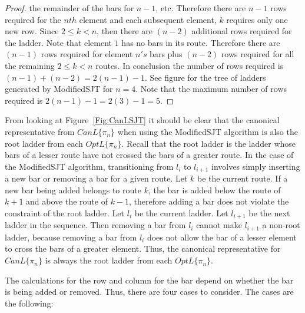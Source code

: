 \begin{proof}
  the remainder of the bars for $n-1$, etc. Therefore there are $n-1$ rows required for the $nth$ element and each subsequent 
  element, $k$ requires only one new row. Since $2 \leq k < n$, then there are $(n-2)$ additional rows required for the ladder. Note that element 
  $1$ has no bars in its route. Therefore there are $(n-1)$ rows required for element $n's$ bars  plus $(n-2)$ rows required for 
  all the remaining $2 \leq k < n$ routes. In conclusion the number of rows required is $(n-1) + (n-2) = 2(n-1)-1$. 
  See figure for the tree of ladders 
  generated by {\sc ModifiedSJT} for $n=4$. Note that the maximum number of rows required is $2(n-1)-1=2(3)-1=5$.
\end{proof}



From looking at Figure~\ref{Fig:CanLSJT} it should be clear that the canonical representative from $CanL\{\pi_{n}\}$ when using the 
{\sc ModifiedSJT} algorithm is also the root ladder from each $OptL\{\pi_{n}\}$. Recall that the root ladder is the 
ladder whose bars of a lesser route have not crossed the bars of a greater route. In the case of the 
{\sc ModifiedSJT} algorithm, transitioning from $l_{i}$ to $l_{i+1}$ involves simply inserting a new bar 
or removing a bar for a given route. Let $k$ be the current route. If a new bar being added belongs to 
route $k$, the bar is added below the route of $k+1$ and above the route of $k-1$, therefore 
adding a bar does not violate the constraint of the root ladder. Let $l_{i}$ be the current ladder.
Let $l_{i+1}$ be the next ladder in the sequence. 
Then removing a bar from $l_{i}$ cannot make $l_{i+1}$ a non-root ladder, because 
removing a bar from $l_{i}$ does not allow the bar of a lesser element to cross the bars of a greater element.
Thus, the canonical representative for $CanL\{\pi_{n}\}$ is always the root ladder from each $OptL\{\pi_{n}\}$.\par 



The calculations for the row and column for the bar 
depend on whether the bar is being added or removed. Thus, there are
four cases to consider. The cases are the following: 
\begin{caseof}
 ~
 ~
 ~
 ~
\end{caseof}

